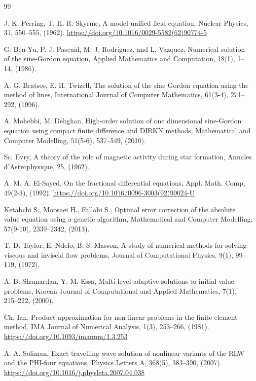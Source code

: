 \documentclass[10pt,letterpaper,twoside]{article}
\begin{document}
\begin{thebibliography}{99}

 J. K. Perring, T. H. R. Skyrme, A model unified field equation, Nuclear Physics, 31, 550--555, (1962). \href{https://doi.org/10.1016/0029-5582(62)90774-5}{https://doi.org/10.1016/0029-5582(62)90774-5}

 G. Ben-Yu, P. J. Pascual, M. J. Rodriguez, and L. Vazquez, Numerical solution of the sine-Gordon equation, Applied Mathematics and Computation, 18(1), 1--14, (1986).

 A. G. Bratsos, E. H. Twizell, The solution of the sine Gordon equation using the method of lines, International Journal of Computer Mathematics, 61(3-4), 271--292, (1996).

 A. Mohebbi, M. Dehghan, High-order solution of one dimensional sine-Gordon equation using compact finite difference and DIRKN methods, Mathematical and Computer Modelling, 51(5-6), 537--549, (2010).

 Sc. Evry, A theory of the role of magnetic activity during star formation, Annales d'Astrophysique, 25, (1962).

 A. M. A. El-Sayed, On the fractional differential equations, Appl. Math. Comp, 49(2-3), (1992). \href{https://doi.org/10.1016/0096-3003(92)90024-U}{https://doi.org/10.1016/0096-3003(92)90024-U}

 Ketabchi S., Moosaei H., Fallahi S., Optimal error correction of the absolute value equation using a genetic algorithm, Mathematical and Computer Modelling, 57(9-10), 2339--2342, (2013).

 T. D. Taylor, E. Ndefo, B. S. Masson, A study of numerical methods for solving viscous and inviscid flow problems, Journal of Computational Physics, 9(1), 99--119, (1972).

 A. B. Shamardan, Y. M. Essa, Multi-level adaptive solutions to initial-value problems, Korean Journal of Computational and Applied Mathematics, 7(1), 215--222, (2000).

 Ch. Ian, Product approximation for non-linear problems in the finite element method, IMA Journal of Numerical Analysis, 1(3), 253--266, (1981). \href{https://doi.org/10.1093/imanum/1.3.253}{https://doi.org/10.1093/imanum/1.3.253}

 A. A. Soliman, Exact travelling wave solution of nonlinear variants of the RLW and the PHI-four equations, Physics Letters A, 368(5), 383--390, (2007). \href{https://doi.org/10.1016/j.physleta.2007.04.038}{https://doi.org/10.1016/j.physleta.2007.04.038}


\end{thebibliography}
\end{document}
